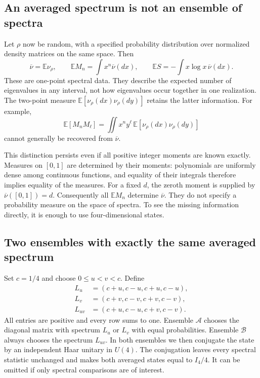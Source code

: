 \documentclass[11pt,letterpaper]{article}
\theoremstyle{plain}
\theoremstyle{definition}
\theoremstyle{remark}
\newcommand{\E}{\mathbb{E}}
\begin{document}
\subsection{An averaged spectrum is not an ensemble of spectra}
\label{subsec11:four_levels}

Let $\rho$ now be random, with a specified probability distribution over
normalized density matrices on the same space. Then
\begin{equation}
 \overline\nu=\E\nu_\rho,\qquad
 \E M_n=\int x^n\overline\nu(dx),\qquad
 \E S=-\int x\log x\,\overline\nu(dx).
 \label{eq11:averaged_measure}
\end{equation}
These are one-point spectral data. They describe the expected number
of eigenvalues in any interval, not how eigenvalues occur together in
one realization. The two-point measure
$\E[\nu_\rho(dx)\nu_\rho(dy)]$ retains the latter information.
For example,
\begin{equation}
 \E[M_nM_\ell]
 =\iint x^ny^\ell\,\E[\nu_\rho(dx)\nu_\rho(dy)]
 \label{eq11:two_point_measure}
\end{equation}
cannot generally be recovered from $\overline\nu$.

This distinction persists even if all positive integer moments are
known exactly. Measures on $[0,1]$ are determined by their moments:
polynomials are uniformly dense among continuous functions, and equality
of their integrals therefore implies equality of the measures. For a
fixed $d$, the zeroth moment is supplied by $\overline\nu([0,1])=d$.
Consequently all $\E M_n$ determine $\overline\nu$. They do not
specify a probability measure on the space of spectra. To see the
missing information directly, it is enough to use four-dimensional
states.

\subsection{Two ensembles with exactly the same averaged spectrum}
\label{subsec11:formal_argument}

Set $c=1/4$ and choose $0\leq u<v<c$. Define
\begin{equation}
 \begin{aligned}
 L_u&=(c+u,c-u,c+u,c-u),\\
 L_v&=(c+v,c-v,c+v,c-v),\\
 L_{uv}&=(c+u,c-u,c+v,c-v).
 \end{aligned}
 \label{eq11:exact_spectra}
\end{equation}
All entries are positive and every row sums to one. Ensemble
$\mathcal A$ chooses the diagonal matrix with spectrum $L_u$ or $L_v$
with equal probabilities. Ensemble $\mathcal B$ always chooses the
spectrum $L_{uv}$. In both ensembles we then conjugate the state by an
independent Haar unitary in $U(4)$. The conjugation leaves every spectral
statistic unchanged and makes both averaged states equal to $I_4/4$.
It can be omitted if only spectral comparisons are of interest.
\end{document}
